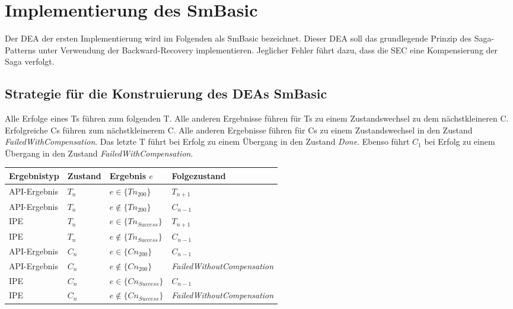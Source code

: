 \section{Implementierung des SmBasic}

Der DEA der ersten Implementierung wird im Folgenden als SmBasic bezeichnet. Dieser DEA soll das grundlegende Prinzip des Saga-Patterns unter Verwendung der Backward-Recovery implementieren. Jeglicher Fehler führt dazu, dass die SEC eine Kompensierung der Saga verfolgt.

\subsection{Strategie für die Konstruierung des DEAs SmBasic}

Alle Erfolge eines Ts führen zum folgenden T. Alle anderen Ergebnisse führen für Ts zu einem Zustandswechsel zu dem nächstkleineren C. Erfolgreiche Cs führen zum nächstkleinerem C. Alle anderen Ergebnisse führen für Cs zu einem Zustandswechsel in den Zustand \textit{FailedWithCompensation}. Das letzte T führt bei Erfolg zu einem Übergang in den Zustand \textit{Done}. Ebenso führt $C_1$ bei Erfolg zu einem Übergang in den Zustand \textit{FailedWithCompensation}. 

\begin{center}
	\begin{longtable}[h]{|p{2.6cm}|p{2cm}|p{2.8cm}|p{5cm}|}
		\hline
		Ergebnistyp & Zustand & Ergebnis $e$& Folgezustand \\ \hline
		API-Ergebnis & $T_n$ & $e \in \{Tn_{200}\}$ & $T_{n+1}$ \\ \hline
		API-Ergebnis & $T_n$ & $e \not\in \{Tn_{200}\}$ & $C_{n-1}$ \\ \hline
		IPE & $T_n$ & $e \in \{Tn_{Success}\}$ & $T_{n+1}$\\ \hline
		IPE & $T_n$ & $e \not\in \{Tn_{Success}\}$ & $C_{n-1}$\\ \hline
		API-Ergebnis & $C_n$ & $e \in \{Cn_{200}\}$ & $C_{n-1}$ \\ \hline
		API-Ergebnis & $C_n$ & $e \not\in \{Cn_{200}\}$ & \textit{FailedWithoutCompensation} \\ \hline
		IPE & $C_n$ & $e \in \{Cn_{Success}\}$ & $C_{n-1}$\\ \hline
		IPE & $C_n$ & $e \not\in \{Cn_{Success}\}$ & \textit{FailedWithoutCompensation}\\ \hline
	\end{longtable}
\end{center}
\FloatBarrier

